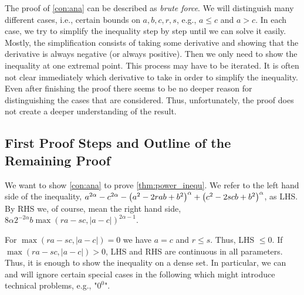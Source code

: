 The proof of \autoref{con:ana} can be described as \textit{brute force}. We will distinguish many different cases, i.e., certain bounds on $a,b,c,r,s$, e.g., $a\leq c$ and $a> c$. In each case, we try to simplify the inequality step by step until we can solve it easily. Mostly, the simplification consists of taking some derivative and showing that the derivative is always negative (or always positive). Then we only need to show the inequality at one extremal point. This process may have to be iterated. It is often not clear immediately which derivative to take in order to simplify the inequality. Even after finishing the proof there seems to be no deeper reason for distinguishing the cases that are considered. Thus, unfortunately, the proof does not create a deeper understanding of the result.
%
%
%
\subsection{First Proof Steps and Outline of the Remaining Proof}
%
We want to show \autoref{con:ana} to prove \autoref{thm:power_inequ}.
We refer to the left hand side of the inequality, $a^{2\alpha}-c^{2\alpha}-\left( a^2-2rab+b^2 \right)^\alpha+\left( c^2-2scb+b^2 \right)^\alpha $, as LHS. By RHS we, of course, mean the right hand side, $8 \alpha 2^{-2\alpha} b \max(ra - sc, |a-c|)^{2\alpha-1}$.

For $\max(ra - sc, |a-c|)=0$ we have $a=c$ and $r\leq s$. Thus, LHS $\leq 0$. If $\max(ra - sc, |a-c|)>0$, LHS and RHS are continuous in all parameters. Thus, it is enough to show the inequality on a dense set. In particular, we can and will ignore certain special cases in the following which might introduce technical problems, e.g., "$0^0$".

